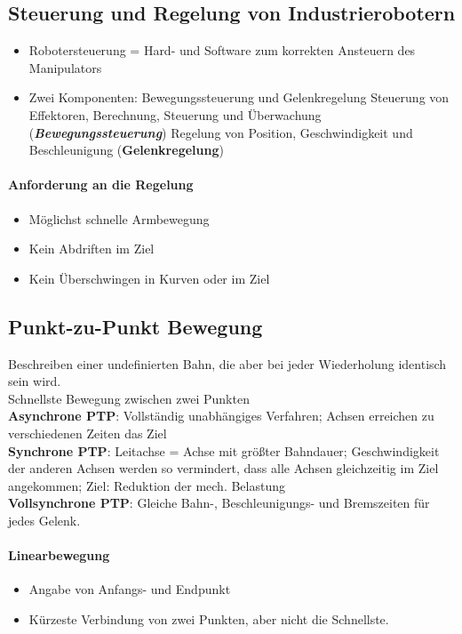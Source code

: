 \subsection{Steuerung und Regelung von Industrierobotern}
\begin{itemize}
	\item Robotersteuerung = Hard- und Software zum korrekten Ansteuern des Manipulators
	\item Zwei Komponenten: Bewegungssteuerung und Gelenkregelung
	\subitem Steuerung von Effektoren, Berechnung, Steuerung und Überwachung (\textbf{\textit{Bewegungssteuerung}})
	\subitem Regelung von Position, Geschwindigkeit und Beschleunigung (\textbf{Gelenkregelung})
\end{itemize}
\paragraph{Anforderung an die Regelung}
\begin{itemize}
	\item Möglichst schnelle Armbewegung
	\item Kein Abdriften im Ziel
	\item Kein Überschwingen in Kurven oder im Ziel
\end{itemize}
\subsection{Punkt-zu-Punkt Bewegung}
Beschreiben einer undefinierten Bahn, die aber bei jeder Wiederholung identisch sein wird.\\
Schnellste Bewegung zwischen zwei Punkten\\
\textbf{Asynchrone PTP}: Vollständig unabhängiges Verfahren; Achsen erreichen zu verschiedenen Zeiten das Ziel\\
\textbf{Synchrone PTP}: Leitachse = Achse mit größter Bahndauer; Geschwindigkeit der anderen Achsen werden so vermindert, dass alle Achsen gleichzeitig im Ziel angekommen; Ziel: Reduktion der mech. Belastung\\
\textbf{Vollsynchrone PTP}: Gleiche Bahn-, Beschleunigungs- und Bremszeiten für jedes Gelenk.
\paragraph{Linearbewegung}
\begin{itemize}
	\item Angabe von Anfangs- und Endpunkt
	\item Kürzeste Verbindung von zwei Punkten, aber nicht die Schnellste.
\end{itemize}

